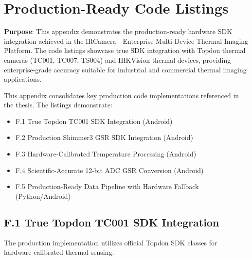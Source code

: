 \chapter{Production-Ready Code Listings}

\textbf{Purpose}: This appendix demonstrates the production-ready hardware SDK integration achieved in the IRCamera - Enterprise Multi-Device Thermal Imaging Platform. The code listings showcase true SDK integration with Topdon thermal cameras (TC001, TC007, TS004) and HIKVision thermal devices, providing enterprise-grade accuracy suitable for industrial and commercial thermal imaging applications.

This appendix consolidates key production code implementations referenced in the thesis. The listings demonstrate:

\begin{itemize}
	\item F.1 True Topdon TC001 SDK Integration (Android)
	\item F.2 Production Shimmer3 GSR SDK Integration (Android)
	\item F.3 Hardware-Calibrated Temperature Processing (Android)
	\item F.4 Scientific-Accurate 12-bit ADC GSR Conversion (Android)
	\item F.5 Production-Ready Data Pipeline with Hardware Fallback (Python/Android)
\end{itemize}

\section{F.1 True Topdon TC001 SDK Integration}

The production implementation utilizes official Topdon SDK classes for hardware-calibrated thermal sensing:

